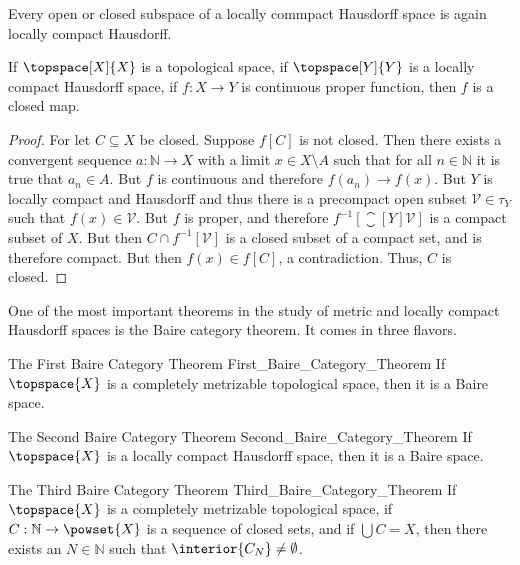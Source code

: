     \begin{theorem}
        Every open or closed subspace of a locally commpact Hausdorff space
        is again locally compact Hausdorff.
    \end{theorem}
    \begin{theorem}
        If $\topspace[X]{X}$ is a topological space, if $\topspace[Y]{Y}$ is
        a locally compact Hausdorff space, if $f:X\rightarrow{Y}$ is
        continuous proper function, then $f$ is a closed map.
    \end{theorem}
    \begin{proof}
        For let $C\subseteq{X}$ be closed. Suppose $f[C]$ is not closed.
        Then there exists a convergent sequence $a:\mathbb{N}\rightarrow{X}$
        with a limit $x\in{X}\setminus{A}$ such that for all
        $n\in\mathbb{N}$ it is true that $a_{n}\in{A}$. But $f$ is
        continuous and therefore $f(a_{n})\rightarrow{f}(x)$. But
        $Y$ is locally compact and Hausdorff and thus there is a precompact
        open subset $\mathcal{V}\in\tau_{Y}$ such that $f(x)\in\mathcal{V}$.
        But $f$ is proper, and therefore
        $f^{\minus{1}}[\closure[Y]{\mathcal{V}}]$ is a compact subset of
        $X$. But then $C\cap{f}^{\minus{1}}[\mathcal{V}]$ is a closed
        subset of a compact set, and is therefore compact. But then
        $f(x)\in{f}[C]$, a contradiction. Thus, $C$ is closed.
    \end{proof}
    One of the most important theorems in the study of metric and locally
    compact Hausdorff spaces is the Baire category theorem. It comes in
    three flavors.
    \begin{ftheorem}{The First Baire Category Theorem}
                    {First_Baire_Category_Theorem}
        If $\topspace{X}$ is a completely metrizable topological space,
        then it is a Baire space.
    \end{ftheorem}
    \begin{ftheorem}{The Second Baire Category Theorem}
                    {Second_Baire_Category_Theorem}
        If $\topspace{X}$ is a locally compact Hausdorff space, then it is
        a Baire space.
    \end{ftheorem}
    \begin{ftheorem}{The Third Baire Category Theorem}
                    {Third_Baire_Category_Theorem}
        If $\topspace{X}$ is a completely metrizable topological space,
        if $C:\mathbb{N}\rightarrow\powset{X}$ is a sequence of closed sets,
        and if $\bigcup{C}=X$, then there exists an $N\in\mathbb{N}$ such
        that $\interior{C_{N}}\ne\emptyset$.
    \end{ftheorem}
